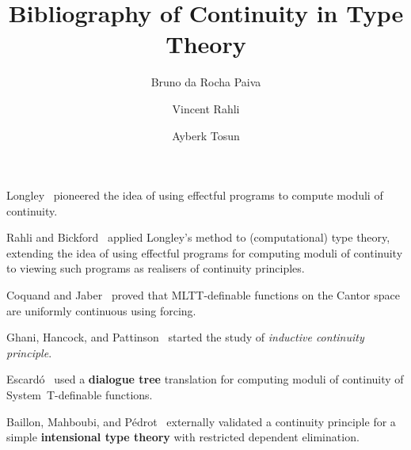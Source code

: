 \documentclass[a4paper]{article}
\title{Bibliography of Continuity in Type Theory}
\author{Bruno da Rocha Paiva \and Vincent Rahli \and Ayberk Tosun}
\begin{document}
\maketitle

Longley~\cite{longley-not-a-functional-program-1999} pioneered the idea of using
effectful programs to compute moduli of continuity.

Rahli and Bickford~\cite{rahli-bickford-mscs-2018} applied Longley's method to
(computational) type theory, extending the idea of using effectful programs
for computing moduli of continuity to viewing such programs as realisers of
continuity principles.

Coquand and Jaber~\cite{coq-jaber-forcing-2012} proved that MLTT-definable
functions on the Cantor space are uniformly continuous using forcing.

Ghani, Hancock, and Pattinson~\cite{ghp-continuous-functions-2006} started the
study of \emph{inductive continuity principle}.

Escard\'o~\cite{mhe-effectful-forcing-2013} used a \textbf{dialogue tree}
translation for computing moduli of continuity of System~T-definable functions.

Baillon, Mahboubi, and P\'edrot~\cite{bmp-pythia-2022} externally validated a
continuity principle for a simple \textbf{intensional type theory} with
restricted dependent elimination.

\newpage
\printbibliography
\end{document}

